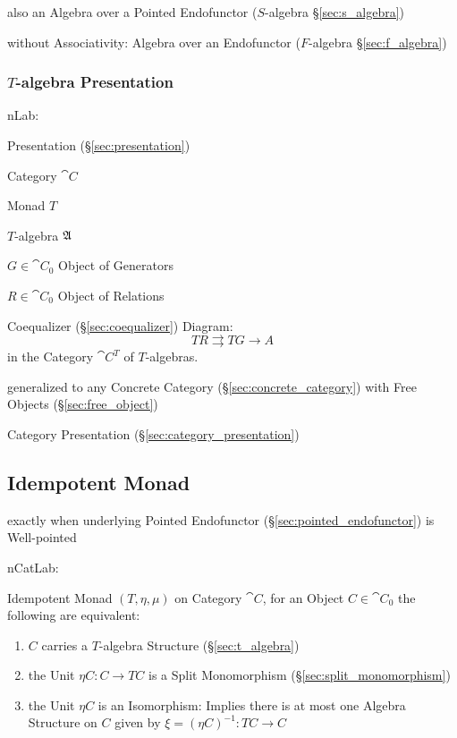 also an Algebra over a Pointed Endofunctor ($S$-algebra
\S\ref{sec:s_algebra})

without Associativity: Algebra over an Endofunctor
($F$-algebra \S\ref{sec:f_algebra})



\subsubsection{$T$-algebra Presentation}
\label{sec:t_algebra_presentation}

nLab:

Presentation (\S\ref{sec:presentation})

Category $\cat{C}$

Monad $T$

$T$-algebra $\mathfrak{A}$

$G \in \cat{C}_0$ Object of Generators

$R \in \cat{C}_0$ Object of Relations

Coequalizer (\S\ref{sec:coequalizer}) Diagram:
\[
  T R \rightrightarrows T G \rightarrow A
\]
in the Category $\cat{C}^T$ of $T$-algebras. %

generalized to any Concrete Category (\S\ref{sec:concrete_category})
with Free Objects (\S\ref{sec:free_object}) %

Category Presentation (\S\ref{sec:category_presentation})



\subsection{Idempotent Monad}\label{sec:idempotent_monad}

exactly when underlying Pointed Endofunctor
(\S\ref{sec:pointed_endofunctor}) is Well-pointed

nCatLab:

Idempotent Monad $(T, \eta, \mu)$ on Category $\cat{C}$, for an Object
$C \in \cat{C}_0$ the following are equivalent:
\begin{enumerate}
  \item $C$ carries a $T$-algebra Structure (\S\ref{sec:t_algebra})
  \item the Unit $\eta C : C \rightarrow T C$ is a Split Monomorphism
    (\S\ref{sec:split_monomorphism})
  \item the Unit $\eta C$ is an Isomorphism: Implies there is at most
    one Algebra Structure on $C$ given by $\xi = (\eta C)^{-1} : T C
    \rightarrow C$ %
\end{enumerate}




